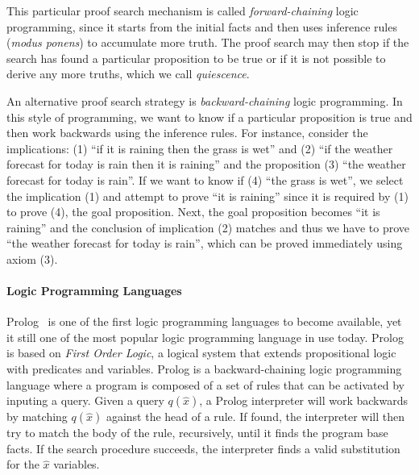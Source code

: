 This particular proof search mechanism is called \emph{forward-chaining} logic
programming, since it starts from the initial facts and
then uses inference rules (\emph{modus ponens}) to accumulate more truth. The
proof search may then stop if the search has found a particular proposition to
be true or if it is not possible to derive any more truths, which we call
\emph{quiescence}.

An alternative proof search strategy is \emph{backward-chaining} logic
programming. In this style of programming, we want to know if a particular
proposition is true and then work backwards using the inference rules. For
instance, consider the implications: (1) ``if it is raining then the grass
is wet'' and (2) ``if the weather forecast for today is rain then it is raining''
and the proposition (3) ``the weather forecast for today is rain''. If we want
to know if (4) ``the grass is wet'', we select the implication (1) and attempt to prove
``it is raining'' since it is required by (1) to prove (4), the goal
proposition. Next, the goal proposition becomes ``it is raining'' and the
conclusion of implication (2) matches and thus we have to prove ``the weather
forecast for today is rain'', which can be proved immediately using axiom (3).

\paragraph{Logic Programming Languages}

Prolog~\cite{Colmerauer:1993:BP:154766.155362} is one of the first logic
programming languages to become available, yet it still one of the most popular
logic programming language in use today. Prolog is based on \emph{First Order
Logic}, a logical system that extends propositional logic with predicates and
variables. Prolog is a backward-chaining logic programming language where a
program is composed of a set of rules that can be activated by inputing a query.
Given a query $q(\hat{x})$, a Prolog interpreter will work backwards by matching
$q(\hat{x})$ against the head of a rule. If found, the interpreter will then try
to match the body of the rule, recursively, until it finds the program base
facts.
If the search procedure succeeds, the interpreter finds a valid substitution for
the $\hat{x}$ variables.

